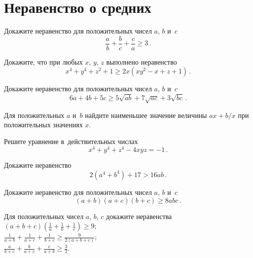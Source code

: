 
\section*{Неравенство о средних}


\begin{problems}

\item
Докажите неравенство для положительных чисел $a$, $b$ и~$c$
\[
    \frac{a}{b}+\frac{b}{c}+\frac{c}{a}
\geq
    3
\, . \]

\item
Докажите, что при любых $x$, $y$, $z$ выполнено неравенство
\[
    x^4 + y^4 + z^2 + 1
\geq
    2 x (x y^2 - x + z + 1)
\, . \]

\item
Докажите неравенство для положительных чисел $a$, $b$ и~$c$
\[
    6 a + 4 b + 5 c
\geq
    5 \sqrt{a b} + 7 \sqrt{a c} + 3 \sqrt{b c}
\, . \]

\item
Для положительных $a$ и~$b$ найдите наименьшее значение величины
$a x + b / x$
при положительных значениях $x$.

\item
Решите уравнение в~действительных числах
\[
    x^4 + y^4 + z^4 - 4 x y z = -1
\, . \]

\item
Докажите неравенство
\[
    2 (a^4 + b^4) + 17 > 16 a b
\, . \]

\item
Докажите неравенство для положительных чисел $a$, $b$ и~$c$
\[
    (a + b) (a + c) (b + c)
\geq
    8 a b c
\, . \]


\item
Для положительных чисел $a$, $b$, $c$ докажите неравенства
\\[0.5ex]
\subproblem
\( \displaystyle
    (a + b + c)
    \left(
        \frac{1}{a} + \frac{1}{b} + \frac{1}{c}
    \right)
\geq
    9
\);
\\[1ex]
\subproblem
\( \displaystyle
    \frac{1}{a + b} + \frac{1}{a + c} + \frac{1}{b + c}
\geq
    \frac{9}{2 (a + b + c)}
\);
\\[1ex]
\subproblem
\( \displaystyle
    \frac{a}{b + c} + \frac{b}{a + c} + \frac{c}{a + b}
\geq
    \frac{3}{2}
\).


\end{problems}

